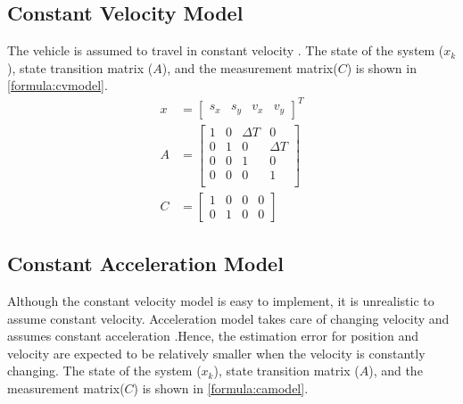 \subsection{Constant Velocity Model}
The vehicle is assumed to travel in constant velocity \cite{Schubert2008}. The state of the system ($x_k$), state transition matrix ($A$), and the measurement matrix($C$) is shown in \eqref{formula:cvmodel}.
\begin{equation}
\label{formula:cvmodel}
\begin{split}
x &=
\left[\begin{matrix}
s_x & s_y & v_x & v_y
\end{matrix}\right]^{T}\\
A&= \left[\begin{matrix}
1 & 0 & \Delta T & 0\\
0 & 1 & 0 & \Delta T\\
0 & 0 & 1 & 0\\
0 & 0 & 0 & 1\\
\end{matrix}\right]\\
C&= \left[\begin{matrix}
1 & 0 & 0 & 0\\
0 & 1 & 0 & 0
\end{matrix}\right]
\end{split}
\end{equation}

\subsection{Constant Acceleration Model}
Although the constant velocity model is easy to implement, it is unrealistic to assume constant velocity. Acceleration model takes care of changing velocity and assumes constant acceleration \cite{Schubert2008}.Hence, the estimation error for position and velocity are expected to be relatively smaller when the velocity is constantly changing. The state of the system ($x_k$), state transition matrix ($A$), and the measurement matrix($C$) is shown in \eqref{formula:camodel}.

